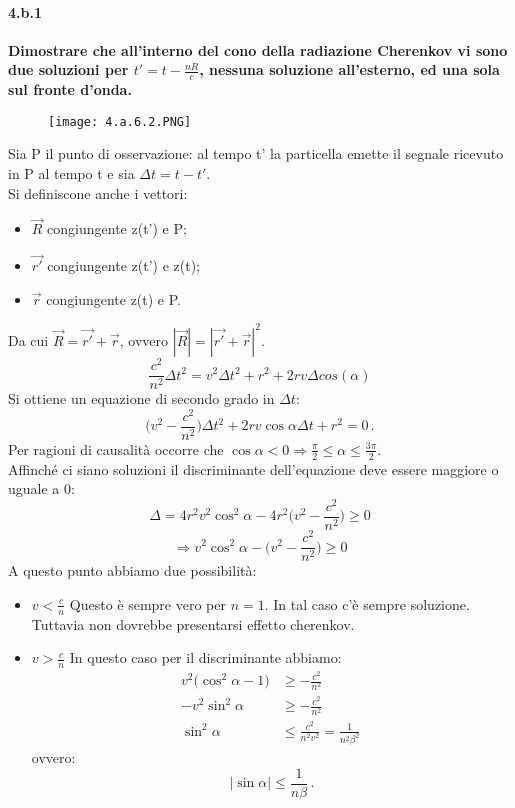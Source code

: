 \documentclass[twoside]{article}
\begin{document}
\paragraph{4.b.1}\textbf{Dimostrare che all’interno del cono della radiazione Cherenkov vi sono due
soluzioni per $t'=t-\frac{nR}{c}$, nessuna soluzione all’esterno, ed una sola sul fronte
d’onda.}\\
\begin{figure}[H]
    \centering
    \texttt{[image: 4.a.6.2.PNG]}
\end{figure}
Sia P il punto di osservazione: al tempo t' la particella emette il segnale ricevuto in P al tempo t e sia $\Delta t=t-t'$.\\
Si definiscone anche i vettori:
\begin{itemize}
    \item $\vec{R}$ congiungente z(t') e P;
    \item $\vec{r'}$ congiungente z(t') e z(t);
    \item $\vec{r}$ congiungente z(t) e P.
\end{itemize}
Da cui $\vec{R}=\vec{r'}+\vec{r}$, ovvero $|\vec{R}|=|\vec{r'}+\vec{r}|^2$.
\begin{equation}
    \frac{c^2}{n^2}\Delta t^2=v^2\Delta t^2+r^2+2rv\Delta cos(\alpha)
\end{equation}
Si ottiene un equazione di secondo grado in $\Delta t$:
\begin{equation*}
\biggl( v^2-\frac{c^2}{n^2} \biggr) \Delta t^2+2rv\cos\alpha \Delta t +r^2=0 \, .
\end{equation*}
Per ragioni di causalità occorre che $\cos\alpha<0 \Rightarrow \frac{\pi}{2} \leq \alpha \leq \frac{3\pi}{2}$.\\
Affinché ci siano soluzioni il discriminante dell'equazione deve essere maggiore o uguale a 0:
\begin{equation*}
\Delta=4r^2v^2\cos^2\alpha-4r^2\biggl( v^2-\frac{c^2}{n^2} \biggr)\geq 0
\end{equation*}
\begin{equation*}
\Rightarrow v^2\cos^2\alpha- \biggl( v^2-\frac{c^2}{n^2} \biggr)\geq 0
\end{equation*}
A questo punto abbiamo due possibilità:
\begin{itemize}
\item $v<\frac{c}{n}$ Questo è sempre vero per $n=1$. In tal caso c'è sempre soluzione. Tuttavia non dovrebbe presentarsi effetto cherenkov.\\
\item $v>\frac{c}{n}$ In questo caso per il discriminante abbiamo:
\begin{align*}
v^2 \biggl( \cos^2 \alpha-1 \biggr) &\geq -\frac{c^2}{n^2}  \\
-v^2 \sin^2\alpha &\geq -\frac{c^2}{n^2}  \\ 
\sin^2\alpha &\leq \frac{c^2}{n^2 v^2}=\frac{1}{n^2 \beta^2} \, 
\end{align*}
ovvero:
\begin{equation*}
|\sin\alpha|\leq \frac{1}{n\beta} \, .
\end{equation*}
\end{itemize}
\end{document}
